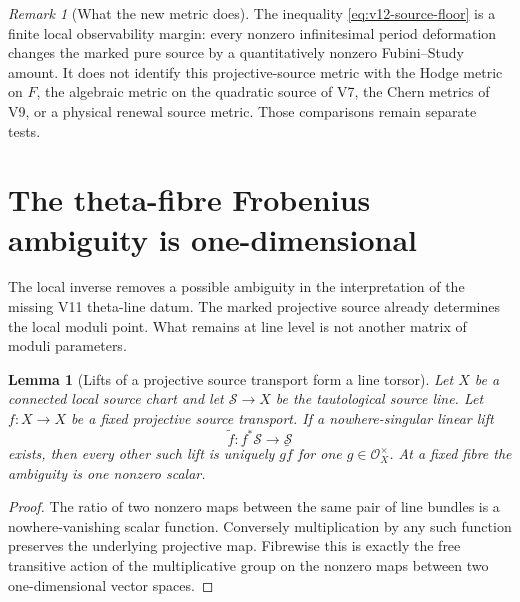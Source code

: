 \documentclass[11pt]{article}
\newtheorem{lemma}[lemma]{Lemma}
\theoremstyle{definition}
\theoremstyle{remark}
\newtheorem{remark}[remark]{Remark}
\begin{document}
\begin{remark}[What the new metric does]
The inequality \cref{eq:v12-source-floor} is a finite local observability
margin: every nonzero infinitesimal period deformation changes the marked pure
source by a quantitatively nonzero Fubini--Study amount.  It does not identify
this projective-source metric with the Hodge metric on \(F\), the algebraic
metric on the quadratic source of V7, the Chern metrics of V9, or a physical
renewal source metric.  Those comparisons remain separate tests.
\end{remark}

\section{The theta-fibre Frobenius ambiguity is one-dimensional}
\label{sec:v12-line-lift}
The local inverse removes a possible ambiguity in the interpretation of the
missing V11 theta-line datum.  The marked projective source already determines
the local moduli point.  What remains at line level is not another matrix of
moduli parameters.

\begin{lemma}[Lifts of a projective source transport form a line torsor]
\label{lem:v12-line-torsor}
Let \(X\) be a connected local source chart and let \(\mathscr S\to X\) be
the tautological source line.  Let \(f:X\to X\) be a fixed projective source
transport.  If a nowhere-singular linear lift
\[
 \widetilde f:f^*\mathscr S\longrightarrow\mathscr S
\]
exists, then every other such lift is uniquely
\(g\widetilde f\) for one \(g\in\mathcal O_X^\times\).  At a fixed fibre the
ambiguity is one nonzero scalar.
\end{lemma}
\begin{proof}
The ratio of two nonzero maps between the same pair of line bundles is a
nowhere-vanishing scalar function.  Conversely multiplication by any such
function preserves the underlying projective map.  Fibrewise this is exactly
the free transitive action of the multiplicative group on the nonzero maps
between two one-dimensional vector spaces.
\end{proof}
\end{document}
